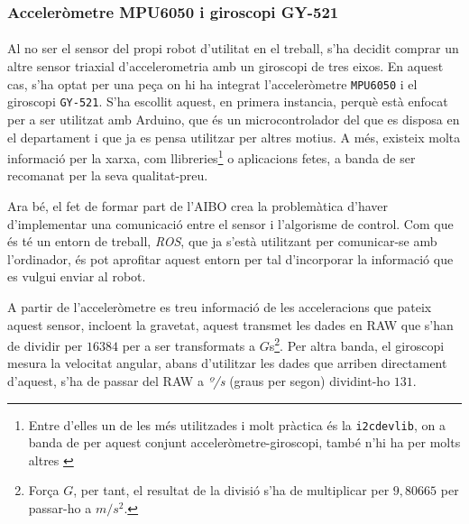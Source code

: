 \documentclass[12pt,a4paper,final,twoside]{article}
\begin{document}
\subsubsection{Acceleròmetre MPU6050 i giroscopi GY-521}

\paragraph{}Al no ser el sensor del propi robot d'utilitat en el treball, s'ha decidit comprar un altre sensor triaxial d'accelerometria amb un giroscopi de tres eixos. En aquest cas, s'ha optat per una peça on hi ha integrat l'acceleròmetre \texttt{MPU6050} i el giroscopi \texttt{GY-521}. S'ha escollit aquest, en primera instancia, perquè està enfocat per a ser utilitzat amb Arduino, que és un microcontrolador del que es disposa en el departament i que ja es pensa utilitzar per altres motius. A més, existeix molta informació per la xarxa, com llibreries\footnote{Entre d'elles un de les més utilitzades i molt pràctica és la \texttt{i2cdevlib}, on a banda de per aquest conjunt acceleròmetre-giroscopi, també n'hi ha per molts altres \cite{Rowberg}} o aplicacions fetes, a banda de ser recomanat per la seva qualitat-preu.


Ara bé, el fet de formar part de l'AIBO crea la problemàtica d'haver d'implementar una comunicació entre el sensor i l'algorisme de control. Com que és té un entorn de treball, \textit{ROS}, que ja s'està utilitzant per comunicar-se amb l'ordinador, és pot aprofitar aquest entorn per tal d'incorporar la informació que es vulgui enviar al robot. 

A partir de l'acceleròmetre es treu informació de les acceleracions que pateix aquest sensor, incloent la gravetat, aquest transmet les dades en RAW que s'han de dividir per $16384$ per a ser transformats a $G$s\footnote{Força $G$, per tant, el resultat de la divisió s'ha de multiplicar per $9,80665$ per passar-ho a $m/s^2$.}. Per altra banda, el giroscopi mesura la velocitat angular, abans d'utilitzar les dades que arriben directament d'aquest, s'ha de passar del RAW a \textit{º/s} (graus per segon) dividint-ho $131$.
\end{document}
